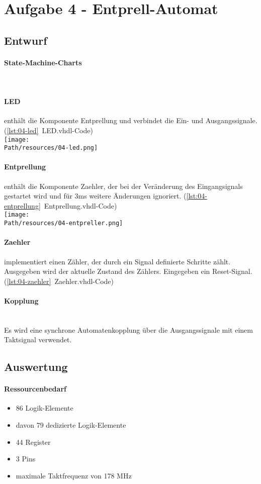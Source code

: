 \section{Aufgabe 4 - Entprell-Automat}
\subsection{Entwurf}
	\paragraph{State-Machine-Charts}\hfill \\

	\paragraph{LED} enthält die Komponente Entprellung und verbindet die Ein- und Ausgangssignale. (\ref{lst:04-led}~LED.vhdl-Code) \\
	\texttt{[image: \\Path/resources/04-led.png]}
	
	\paragraph{Entprellung} enthält die Komponente Zaehler, der bei der Veränderung des Eingangsignals gestartet wird und für 3ms weitere Änderungen ignoriert. (\ref{lst:04-entprellung}~Entprellung.vhdl-Code) \\
	\texttt{[image: \\Path/resources/04-entpreller.png]}


	\paragraph{Zaehler} implementiert einen Zähler, der durch ein Signal definierte Schritte zählt. Ausgegeben wird der aktuelle Zustand des Zählers. Eingegeben ein Reset-Signal. (\ref{lst:04-zaehler}~Zaehler.vhdl-Code) 
	\paragraph{Kopplung} \hfill\\
	Es wird eine synchrone Automatenkopplung über die Ausgangssignale mit einem Taktsignal verwendet.


\subsection{Auswertung}
	\paragraph{Ressourcenbedarf}
	\begin{itemize} 
	\item 86 Logik-Elemente
	\item davon 79 dedizierte Logik-Elemente
	\item 44 Register
	\item 3 Pins 
	\item maximale Taktfrequenz von 178 MHz
	\end{itemize}
